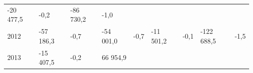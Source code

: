 \begin{longtable}[]{@{}lllllllll@{}}
\begin{minipage}[t]{0.12\columnwidth}
-20 477,5\strut
\end{minipage} & \begin{minipage}[t]{0.06\columnwidth}\raggedright
-0,2\strut
\end{minipage} & \begin{minipage}[t]{0.09\columnwidth}\raggedright
-86 730,2\strut
\end{minipage} & \begin{minipage}[t]{0.06\columnwidth}\raggedright
-1,0\strut
\end{minipage}\tabularnewline
\begin{minipage}[t]{0.05\columnwidth}\raggedright
2012\strut
\end{minipage} & \begin{minipage}[t]{0.10\columnwidth}\raggedright
-57 186,3\strut
\end{minipage} & \begin{minipage}[t]{0.06\columnwidth}\raggedright
-0,7\strut
\end{minipage} & \begin{minipage}[t]{0.16\columnwidth}\raggedright
-54 001,0\strut
\end{minipage} & \begin{minipage}[t]{0.06\columnwidth}\raggedright
-0,7\strut
\end{minipage} & \begin{minipage}[t]{0.12\columnwidth}\raggedright
-11 501,2\strut
\end{minipage} & \begin{minipage}[t]{0.06\columnwidth}\raggedright
-0,1\strut
\end{minipage} & \begin{minipage}[t]{0.09\columnwidth}\raggedright
-122 688,5\strut
\end{minipage} & \begin{minipage}[t]{0.06\columnwidth}\raggedright
-1,5\strut
\end{minipage}\tabularnewline
\begin{minipage}[t]{0.05\columnwidth}\raggedright
2013\strut
\end{minipage} & \begin{minipage}[t]{0.10\columnwidth}\raggedright
-15 407,5\strut
\end{minipage} & \begin{minipage}[t]{0.06\columnwidth}\raggedright
-0,2\strut
\end{minipage} & \begin{minipage}[t]{0.16\columnwidth}\raggedright
66 954,9\strut

\end{minipage}
\end{longtable}
